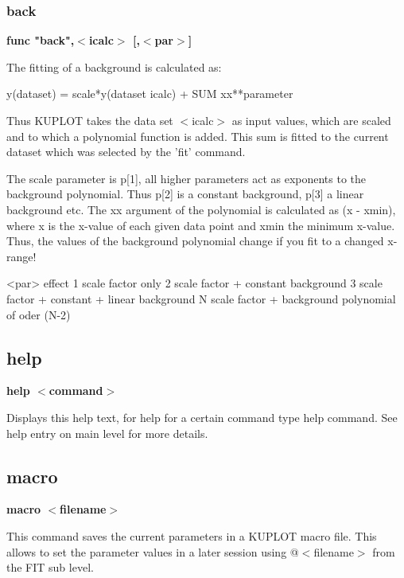 \subsubsection{back}
{\bf func "back",$ <$icalc$> $ [,$ <$par$> $] \par }
\vspace{3pt}
The fitting of a background is calculated as: 
\par
\begin{MacVerbatim}
y(dataset) = scale*y(dataset icalc) + SUM xx**parameter
\end{MacVerbatim}
Thus KUPLOT takes the data set $ <$icalc$> $ as input values, which are 
scaled and to which a polynomial function is added. This sum is 
fitted to the current dataset which was selected by the 'fit' command. 
\par
The scale parameter is p[1], all higher parameters act as exponents 
to the background polynomial. Thus p[2] is a constant background, 
p[3] a linear background etc. The xx argument of the polynomial 
is calculated as (x - xmin), where x is the x-value of each given 
data point and xmin the minimum x-value. Thus, the values of the 
background polynomial change if you fit to a changed x-range! 
\par
\begin{MacVerbatim}
<par>  effect
1      scale factor only
2      scale factor + constant background
3      scale factor + constant + linear background
N      scale factor + background polynomial of oder (N-2)
\end{MacVerbatim}
\subsection*{help}
{\bf help $ <$command$> $ \par }
\par
\vspace{3pt}
Displays this help text, for help for a certain command type help 
command. See help entry on main level for more details. 
\subsection*{macro}
{\bf macro $ <$filename$> $ \par }
\par
\vspace{3pt}
This command saves the current parameters in a KUPLOT macro file. 
This allows to set the parameter values in a later session using 
@$ <$filename$> $ from the FIT sub level. 
